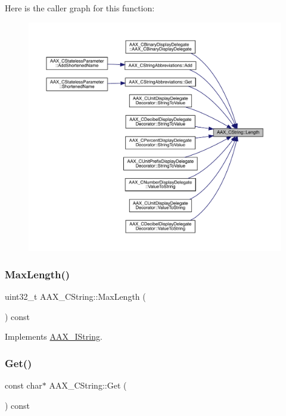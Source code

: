 Here is the caller graph for this function\+:
\nopagebreak
\begin{figure}[H]
\begin{center}
\leavevmode
\includegraphics[width=350pt]{a01573_a34ccfa250b53a721417f32d4a74bfed6_icgraph}
\end{center}
\end{figure}
\mbox{\label{a01573_afa2fe6beae083e3ec266f49d7583473c}} 
\subsubsection{\texorpdfstring{MaxLength()}{MaxLength()}}
{\footnotesize\ttfamily uint32\+\_\+t A\+A\+X\+\_\+\+C\+String\+::\+Max\+Length (\begin{DoxyParamCaption}{ }\end{DoxyParamCaption}) const\hspace{0.3cm}{\ttfamily [virtual]}}



Implements \mbox{\hyperlink{a01873_aa898760d69880aeefbd42c0109889c59}{A\+A\+X\+\_\+\+I\+String}}.

\mbox{\label{a01573_aa0371a2a15513a4d160d4a741c0a953e}} 
\subsubsection{\texorpdfstring{Get()}{Get()}}
{\footnotesize\ttfamily const char$\ast$ A\+A\+X\+\_\+\+C\+String\+::\+Get (\begin{DoxyParamCaption}{ }\end{DoxyParamCaption}) const\hspace{0.3cm}{\ttfamily [virtual]}}

